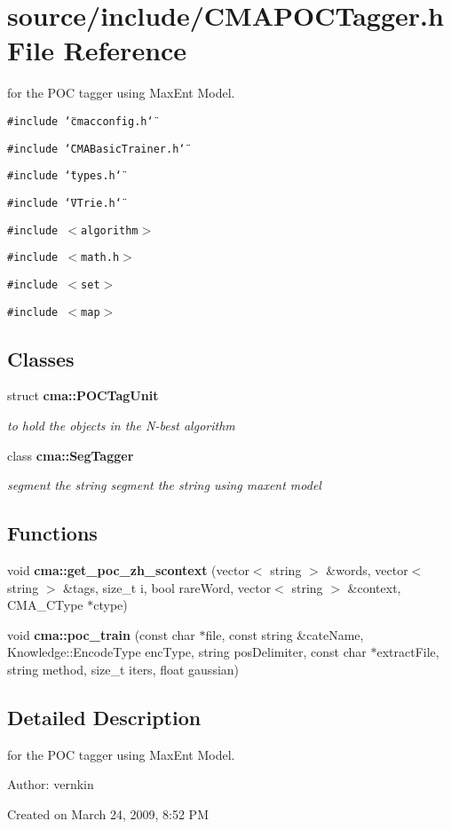 \section{source/include/CMAPOCTagger.h File Reference}
\label{CMAPOCTagger_8h}
for the POC tagger using MaxEnt Model.  


{\tt \#include \char`\"{}cmacconfig.h\char`\"{}}\par
{\tt \#include \char`\"{}CMABasicTrainer.h\char`\"{}}\par
{\tt \#include \char`\"{}types.h\char`\"{}}\par
{\tt \#include \char`\"{}VTrie.h\char`\"{}}\par
{\tt \#include $<$algorithm$>$}\par
{\tt \#include $<$math.h$>$}\par
{\tt \#include $<$set$>$}\par
{\tt \#include $<$map$>$}\par
\subsection*{Classes}
\begin{CompactItemize}
\item 
struct {\bf cma::POCTagUnit}
\begin{CompactList}\small\item\em to hold the objects in the N-best algorithm \item\end{CompactList}\item 
class {\bf cma::SegTagger}
\begin{CompactList}\small\item\em segment the string segment the string using maxent model \item\end{CompactList}\end{CompactItemize}
\subsection*{Functions}
\begin{CompactItemize}
\item 
void {\bf cma::get\_\-poc\_\-zh\_\-scontext} (vector$<$ string $>$ \&words, vector$<$ string $>$ \&tags, size\_\-t i, bool rareWord, vector$<$ string $>$ \&context, CMA\_\-CType $\ast$ctype)
\item 
void {\bf cma::poc\_\-train} (const char $\ast$file, const string \&cateName, Knowledge::EncodeType encType, string posDelimiter, const char $\ast$extractFile, string method, size\_\-t iters, float gaussian)
\end{CompactItemize}


\subsection{Detailed Description}
for the POC tagger using MaxEnt Model. 

\begin{Desc}
\item[Author:]vernkin\end{Desc}
Created on March 24, 2009, 8:52 PM 